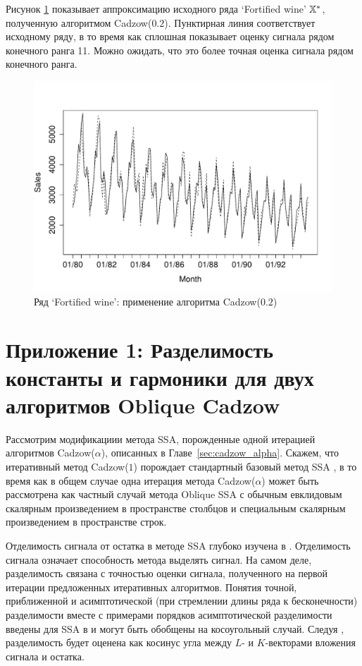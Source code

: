 \documentclass[12pt, specialist, subf,href,colorlinks=true,substylefile = spbu.rtx]{disser}
\theoremstyle{remark}
\theoremstyle{definition}
\begin{document}
Рисунок \ref{fig:rl} показывает аппроксимацию исходного ряда `Fortified wine' $\mathbb{X}^*$, полученную алгоритмом Cadzow($0.2$). 
Пунктирная линия соответствует исходному ряду, в то время как сплошная показывает оценку сигнала рядом конечного ранга 11.
Можно ожидать, что это более точная оценка сигнала рядом конечного ранга.

\begin{figure}[!hhh]
	\includegraphics[width = \columnwidth]{rlimage.pdf}
	\caption{Ряд `Fortified wine': применение алгоритма Cadzow($0.2$)}
	\label{fig:rl}
\end{figure}

\chapter{Приложение 1: Разделимость константы и гармоники для двух алгоритмов Oblique Cadzow}
\label{sec:app}

Рассмотрим модификациии метода SSA, порожденные одной итерацией алгоритмов Cadzow($\alpha$), описанных в Главе~\ref{sec:cadzow_alpha}. Скажем, что итеративный метод Cadzow($1$) порождает стандартный базовый метод SSA \cite{Golyandina.etal2001,Golyandina.Zhigljavsky2012}, в то время как в общем случае одна итерация метода Cadzow($\alpha$) может быть рассмотрена как частный случай метода Oblique SSA \cite{Golyandina2013} с обычным евклидовым скалярным произведением в пространстве столбцов и специальным скалярным произведением в пространстве строк.

Отделимость сигнала от остатка в методе SSA глубоко изучена в \cite{Golyandina.etal2001,Golyandina2010}. Отделимость сигнала означает способность метода выделять сигнал. На самом деле, разделимость связана с точностью оценки сигнала, полученного на первой итерации предложенных итеративных алгоритмов. Понятия точной, приближенной и асимптотической (при стремлении длины ряда к бесконечности) разделимости вместе с примерами порядков асимптотической разделимости введены для SSA в \cite{Golyandina.etal2001} и могут быть обобщены на косоугольный случай. Следуя \cite{Golyandina.etal2001}, разделимость будет оценена как косинус угла между $L$- и $K$-векторами вложения сигнала и остатка.
\end{document}
